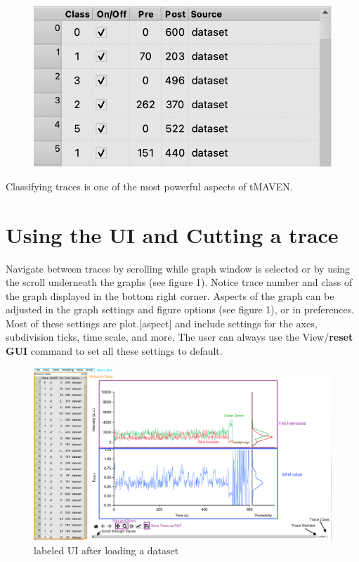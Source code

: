 \documentclass[11pt,a5paper,footinclude=true,headinclude=true]{scrbook} %
\begin{document}
         
    \begin{figure} [h]
   \centering
   \includegraphics[scale=0.5]{Molecule Table Sample.png}   
   \end{figure}
     Classifying traces is one of the most powerful aspects of tMAVEN. 

  
    \section{Using the UI and Cutting a trace}
    
   
Navigate between traces by scrolling while graph window is selected or by using the scroll underneath the graphs (see figure 1). Notice trace number and class of the graph displayed in the bottom right corner. Aspects of the graph can be adjusted in the graph settings and figure options (see figure 1), or in preferences. Most of these settings are plot.[aspect] and include settings for the axes, subdivision ticks, time scale, and more. The user can always use the View/\textbf{reset GUI} command to set all these settings to default. 
\begin{figure} [h]
    \renewcommand{\figurename}{Figure 1}
    \renewcommand{\thefigure}{}
   \centering
   \includegraphics[scale=0.33]{General UI.png}
   \caption{labeled UI after loading a dataset}
   \end{figure}
\end{document}
